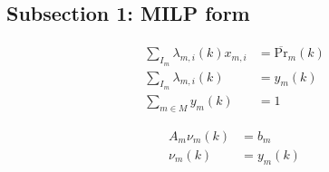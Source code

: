\documentclass{tufte-handout}
\begin{document}
\subsection{Subsection 1: MILP form}
\begin{equation}
\begin{split}
\sum_{I_m} \lambda_{m, i} \left(k\right) x_{m, i} &= \overline{\text{Pr}}_m \left(k \right) \\
\sum_{I_m} \lambda_{m, i} \left(k\right) & = y_m \left(k\right) \\
\sum_{m \in M} y_m \left(k\right) & = 1
\end{split}
\end{equation}



\begin{equation}
\begin{split}
	A_m \nu_m \left(k\right) &= b_m \\
	\nu_m \left(k\right) & = y_{m} \left(k\right)
\end{split}
\end{equation}

\end{document}
